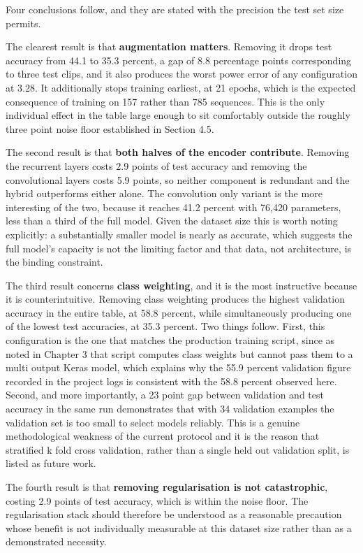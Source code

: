 Four conclusions follow, and they are stated with the precision the test set size permits.

The clearest result is that \textbf{augmentation matters}. Removing it drops test accuracy from 44.1 to 35.3 percent, a gap of 8.8 percentage points corresponding to three test clips, and it also produces the worst power error of any configuration at 3.28. It additionally stops training earliest, at 21 epochs, which is the expected consequence of training on 157 rather than 785 sequences. This is the only individual effect in the table large enough to sit comfortably outside the roughly three point noise floor established in Section 4.5.

The second result is that \textbf{both halves of the encoder contribute}. Removing the recurrent layers costs 2.9 points of test accuracy and removing the convolutional layers costs 5.9 points, so neither component is redundant and the hybrid outperforms either alone. The convolution only variant is the more interesting of the two, because it reaches 41.2 percent with 76,420 parameters, less than a third of the full model. Given the dataset size this is worth noting explicitly: a substantially smaller model is nearly as accurate, which suggests the full model's capacity is not the limiting factor and that data, not architecture, is the binding constraint.

The third result concerns \textbf{class weighting}, and it is the most instructive because it is counterintuitive. Removing class weighting produces the highest validation accuracy in the entire table, at 58.8 percent, while simultaneously producing one of the lowest test accuracies, at 35.3 percent. Two things follow. First, this configuration is the one that matches the production training script, since as noted in Chapter 3 that script computes class weights but cannot pass them to a multi output Keras model, which explains why the 55.9 percent validation figure recorded in the project logs is consistent with the 58.8 percent observed here. Second, and more importantly, a 23 point gap between validation and test accuracy in the same run demonstrates that with 34 validation examples the validation set is too small to select models reliably. This is a genuine methodological weakness of the current protocol and it is the reason that stratified k fold cross validation, rather than a single held out validation split, is listed as future work.

The fourth result is that \textbf{removing regularisation is not catastrophic}, costing 2.9 points of test accuracy, which is within the noise floor. The regularisation stack should therefore be understood as a reasonable precaution whose benefit is not individually measurable at this dataset size rather than as a demonstrated necessity.

